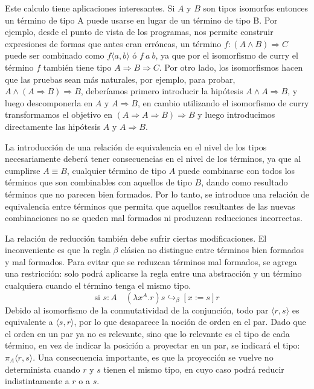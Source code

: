 \documentclass[a4paper,10pt]{article}
\begin{document}
Este calculo tiene aplicaciones interesantes. Si $A$ y $B$ son tipos isomorfos entonces un término de tipo A puede usarse en lugar de un término de tipo B. Por ejemplo, desde el punto de vista de los programas, nos permite construir expresiones de formas que antes eran erróneas, un término $f : (A \wedge B) \Rightarrow C$ puede ser combinado como $f \langle a, b \rangle$ ó $f \: a \: b$, ya que por el isomorfismo de curry el término $f$ también tiene tipo $A \Rightarrow B \Rightarrow C$.
Por otro lado, los isomorfismos hacen que las pruebas sean más naturales, por ejemplo, para probar, $A \wedge (A \Rightarrow  B) \Rightarrow B$, deberíamos primero introducir la hipótesis $A \wedge A \Rightarrow  B$, y luego descomponerla en $A$ y $A \Rightarrow B$, en cambio utilizando el isomorfismo de curry transformamos el objetivo en $(A \Rightarrow A \Rightarrow  B) \Rightarrow B$ y luego introducimos directamente las hipótesis $A$ y $A \Rightarrow B$.

La introducción de una relación de equivalencia en el nivel de los tipos necesariamente deberá tener consecuencias en el nivel de los términos, ya que al cumplirse $A \equiv B$, cualquier término de tipo $A$ puede combinarse con todos los términos que son combinables con aquellos de tipo $B$, dando como resultado términos que no parecen bien formados. Por lo tanto, se introduce una relación de equivalencia entre términos que permita que aquellos resultantes de las nuevas combinaciones no se queden mal formados ni produzcan reducciones incorrectas.

La relación de reducción también debe sufrir ciertas modificaciones. El inconveniente es que la regla $\beta$ clásica no distingue entre términos bien formados y mal formados. Para evitar que se reduzcan términos mal formados, se agrega una restricción: solo podrá aplicarse la regla entre una abstracción y un término cualquiera cuando el término tenga el mismo tipo.
\[ \textrm{si $s : A$} \quad (\lambda x^A.r) s \hookrightarrow_\beta [x := s]r \]
Debido al isomorfismo de la conmutatividad de la conjunción, todo par $\langle r, s \rangle$ es equivalente a $\langle s, r \rangle$, por lo que desaparece la noción de orden en el par. Dado que el orden en un par ya no es relevante, sino que lo relevante es el tipo de cada término, en vez de indicar la posición a proyectar en un par, se indicará el tipo: $\pi_A\langle r, s \rangle$. Una consecuencia importante, es que la proyección se vuelve no determinista cuando $r$ y $s$ tienen el mismo tipo, en cuyo caso podrá reducir indistintamente a $r$ o a $s$.
\end{document}

